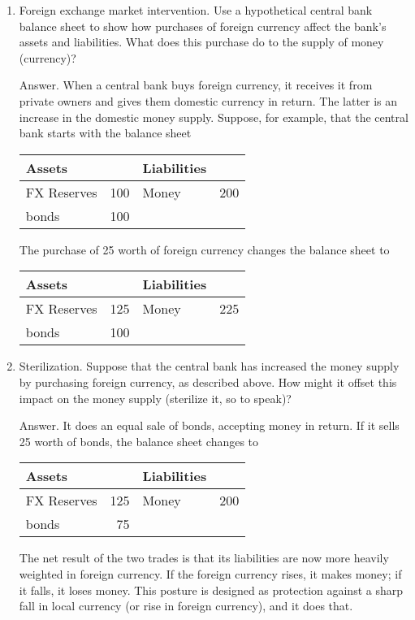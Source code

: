 \setlength{\leftmargini}{.5\oldleftmargini}
\begin{enumerate}
\item Foreign exchange market intervention.
Use a hypothetical central bank  balance sheet to show how
purchases of foreign currency affect the bank's assets and liabilities. What does this purchase do to the supply of money (currency)?

Answer.  When a central bank  buys foreign currency,
it receives it from private owners and gives them
    domestic currency in return.
    The latter is an increase in the domestic money supply.
    Suppose, for example, that the central bank 
    starts with the balance sheet
\begin{center}
\begin{tabular}{lr|lr}
               Assets  &     &     Liabilities                     \\
               \hline
               FX Reserves &  100 &     Money  &  200   \\
               bonds   & 100 & \\
\end{tabular}
\end{center}
%
The purchase of 25 worth of foreign currency
changes the balance sheet to
%
\begin{center}
\begin{tabular}{lr|lr}
               Assets  &     &     Liabilities                     \\
               \hline
               FX Reserves &  125 &     Money  &  225   \\
               bonds   & 100 & \\
\end{tabular}
\end{center}
%

\item Sterilization.  Suppose that the central bank has increased the money supply by purchasing foreign currency, as described above.
    How might it offset this impact on the money supply (sterilize it, so to speak)?

Answer.  It does an equal sale of bonds, accepting money in return.
If it sells 25 worth of bonds, the balance sheet changes to
\begin{center}
\begin{tabular}{lr|lr}
               Assets  &     &     Liabilities                     \\
               \hline
               FX Reserves &  125 &     Money  &  200   \\
               bonds   & 75 & \\
\end{tabular}
\end{center}
%
The net result of the two trades is that its liabilities are now more heavily weighted in foreign currency.
If the foreign currency rises, it makes money; if it falls, it loses money.
This posture is designed as protection against a sharp fall in local currency (or rise in foreign currency), and it does that.


\end{enumerate}
